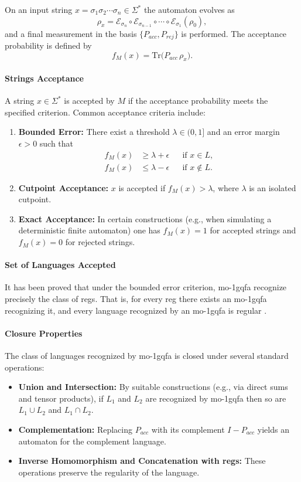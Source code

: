 On an input string $x=\sigma_1\sigma_2\cdots\sigma_n\in\Sigma^*$ the automaton evolves as
\[
\rho_x = \mathcal{E}_{\sigma_n}\circ \mathcal{E}_{\sigma_{n-1}}\circ\cdots\circ \mathcal{E}_{\sigma_1}(\rho_0),
\]
and a final measurement in the basis $\{P_{acc},P_{rej}\}$ is performed. The acceptance probability is defined by
\[
f_M(x)=\mathrm{Tr}\bigl(P_{acc}\,\rho_x\bigr).
\]

\paragraph{Strings Acceptance} 
A string $x\in\Sigma^*$ is accepted by $M$ if the acceptance probability meets the specified criterion. Common acceptance criteria include:
\begin{enumerate}
  \item \textbf{Bounded Error:} There exist a threshold $\lambda\in(0,1]$ and an error margin $\epsilon>0$ such that
  \[
  \begin{aligned}
  f_M(x) &\ge \lambda+\epsilon &&\text{if } x\in L,\\[1mm]
  f_M(x) &\le \lambda-\epsilon &&\text{if } x\notin L.
  \end{aligned}
  \]
  \item \textbf{Cutpoint Acceptance:} $x$ is accepted if $f_M(x)>\lambda$, where $\lambda$ is an isolated cutpoint.
  \item \textbf{Exact Acceptance:} In certain constructions (e.g., when simulating a deterministic finite automaton) one has $f_M(x)=1$ for accepted strings and $f_M(x)=0$ for rejected strings.
\end{enumerate}

\paragraph{Set of Languages Accepted}  
It has been proved that under the bounded error criterion, \gls{mo-1gqfa} recognize precisely the class of \glspl{reg}. That is, for every \gls{reg} there exists an \gls{mo-1gqfa} recognizing it, and every language recognized by an \gls{mo-1gqfa} is regular \cite{li2012characterizations}.

\paragraph{Closure Properties}  
The class of languages recognized by \gls{mo-1gqfa} is closed under several standard operations:
\begin{itemize}
  \item \textbf{Union and Intersection:} By suitable constructions (e.g., via direct sums and tensor products), if $L_1$ and $L_2$ are recognized by \gls{mo-1gqfa} then so are $L_1\cup L_2$ and $L_1\cap L_2$.
  \item \textbf{Complementation:} Replacing $P_{acc}$ with its complement $I-P_{acc}$ yields an automaton for the complement language.
  \item \textbf{Inverse Homomorphism and Concatenation with \glspl{reg}:} These operations preserve the regularity of the language.
\end{itemize}

